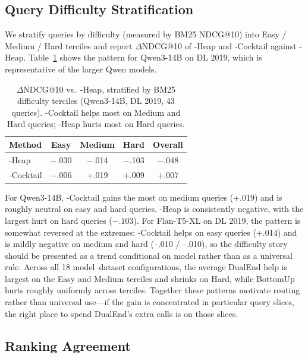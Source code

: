 \subsection{Query Difficulty Stratification}
\label{sec:difficulty}

We stratify queries by difficulty (measured by BM25 NDCG@10) into Easy / Medium / Hard terciles and report $\Delta$NDCG@10 of \bottomup{}-Heap and \dualend{}-Cocktail against \topdown{}-Heap. Table~\ref{tab:difficulty} shows the pattern for Qwen3-14B on DL 2019, which is representative of the larger Qwen models.

\begin{table}[!htbp]
\caption{$\Delta$NDCG@10 vs.\ \topdown{}-Heap, stratified by BM25 difficulty terciles (Qwen3-14B, DL 2019, 43 queries). \dualend{}-Cocktail helps most on Medium and Hard queries; \bottomup{}-Heap hurts most on Hard queries.}
\label{tab:difficulty}
\small
\begin{tabular}{lcccc}
\toprule
Method & Easy & Medium & Hard & Overall \\
\midrule
\bottomup{}-Heap & $-$.030 & $-$.014 & $-$.103 & $-$.048 \\
\dualend{}-Cocktail & $-$.006 & +.019 & +.009 & +.007 \\
\bottomrule
\end{tabular}
\end{table}

For Qwen3-14B, \dualend{}-Cocktail gains the most on medium queries (+.019) and is roughly neutral on easy and hard queries. \bottomup{}-Heap is consistently negative, with the largest hurt on hard queries ($-.103$). For Flan-T5-XL on DL 2019, the pattern is somewhat reversed at the extremes: \dualend{}-Cocktail helps on easy queries (+.014) and is mildly negative on medium and hard (--.010 / --.010), so the difficulty story should be presented as a trend conditional on model rather than as a universal rule. Across all 18 model--dataset configurations, the average DualEnd help is largest on the Easy and Medium terciles and shrinks on Hard, while BottomUp hurts roughly uniformly across terciles. Together these patterns motivate routing rather than universal use---if the gain is concentrated in particular query slices, the right place to spend DualEnd's extra calls is on those slices.


\subsection{Ranking Agreement}
\label{sec:agreement}

